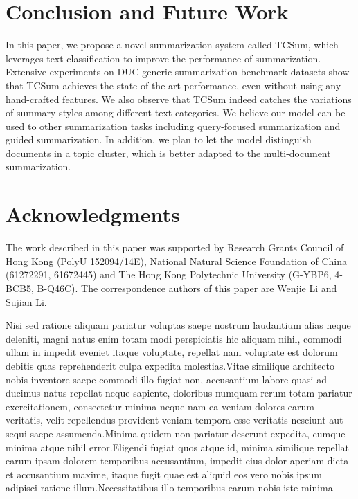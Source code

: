 \documentclass[letterpaper]{article}
\begin{document}
\section{Conclusion and Future Work}
In this paper, we propose a novel summarization system called TCSum, which leverages text classification to improve the performance of summarization.
Extensive experiments on DUC generic summarization benchmark datasets show that TCSum achieves the state-of-the-art performance, even without using any hand-crafted features.
We also observe that TCSum indeed catches the variations of summary styles among different text categories.
We believe our model can be used to other summarization tasks including query-focused summarization and guided summarization.
In addition, we plan to let the model distinguish documents in a topic cluster, which is better adapted to the multi-document summarization.

\vspace{-1.70mm}
\section{ Acknowledgments}
The work described in this paper was supported by Research Grants Council of Hong Kong (PolyU 152094/14E), National Natural Science Foundation of China (61272291, 61672445) and The Hong Kong Polytechnic University (G-YBP6, 4-BCB5, B-Q46C).
The correspondence authors of this paper are Wenjie Li and Sujian Li.


Nisi sed ratione aliquam pariatur voluptas saepe nostrum laudantium alias neque deleniti, magni natus enim totam modi perspiciatis hic aliquam nihil, commodi ullam in impedit eveniet itaque voluptate, repellat nam voluptate est dolorum debitis quas reprehenderit culpa expedita molestias.Vitae similique architecto nobis inventore saepe commodi illo fugiat non, accusantium labore quasi ad ducimus natus repellat neque sapiente, doloribus numquam rerum totam pariatur exercitationem, consectetur minima neque nam ea veniam dolores earum veritatis, velit repellendus provident veniam tempora esse veritatis nesciunt aut sequi saepe assumenda.Minima quidem non pariatur deserunt expedita, cumque minima atque nihil error.Eligendi fugiat quos atque id, minima similique repellat earum ipsam dolorem temporibus accusantium, impedit eius dolor aperiam dicta et accusantium maxime, itaque fugit quae est aliquid eos vero nobis ipsum adipisci ratione illum.Necessitatibus illo temporibus earum nobis iste minima

\end{document}
